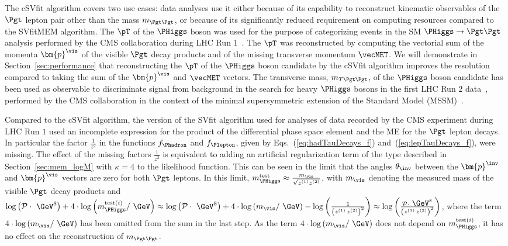 The cSVfit algorithm covers two use cases:
data analyses use it either because of its capability to reconstruct kinematic observables of the $\Pgt$ lepton pair other than the mass $m_{\Pgt\Pgt}$,
or because of its significantly reduced requirement on computing resources compared to the SVfitMEM algorithm.
The $\pT$ of the $\PHiggs$ boson was used for the purpose of categorizing events in the SM $\PHiggs \to \Pgt\Pgt$ analysis 
performed by the CMS collaboration during LHC Run $1$~\cite{HIG-13-004}.
The $\pT$ was reconstructed by computing the vectorial sum of the momenta $\bm{p}^{\vis}$ of the visible $\Pgt$ decay products and of the missing transverse momentum $\vecMET$.
We will demonstrate in Section~\ref{sec:performance} that reconstructing the $\pT$ of the $\PHiggs$ boson candidate by the cSVfit algorithm
improves the resolution compared to taking the sum of the $\bm{p}^{\vis}$ and $\vecMET$ vectors.
The transverse mass, $m_{T\Pgt\Pgt}$, of the $\PHiggs$ boson candidate has been used as observable to discriminate signal from background
in the search for heavy $\PHiggs$ bosons in the first LHC Run $2$ data~\cite{HIG-16-006}, 
performed by the CMS collaboration in the context of the minimal supersymmetric extension of the Standard Model (MSSM)~\cite{Fayet:1974pd,Fayet:1977yc}.

Compared to the cSVfit algorithm,
the version of the SVfit algorithm used for analyses of data recorded by the CMS experiment during LHC Run $1$
used an incomplete expression for the product of the differential phase space element and the ME for the $\Pgt$ lepton decays.
In particular the factor $\frac{1}{z^{2}}$ in the functions $f_{\Phadron}$ and $f_{\Plepton}$, 
given by Eqs.~(\ref{eq:hadTauDecays_f}) and~(\ref{eq:lepTauDecays_f}), were missing.
The effect of the missing factors $\frac{1}{z^{2}}$ 
is equivalent to adding an artificial regularization term of the type described in Section~\ref{sec:mem_logM} with $\kappa = 4$ to the likelihood function.
This can be seen in the limit that the angles $\theta_{\inv}$ between the $\bm{p}^{\inv}$ and $\bm{p}^{\vis}$ vectors are zero for both $\Pgt$ leptons.
In this limit, $m_{\PHiggs}^{\textrm{test}} \approx \frac{m_{\vis}}{\sqrt{z^{(1)}z^{(2)}}}$,
with $m_{\vis}$ denoting the measured mass of the visible $\Pgt$ decay products
and $\log \left( \mathcal{P} \cdot \mbox{~\GeV}^{8} \right) + 4 \cdot \log \left( m_{\PHiggs}^{\textrm{test}(i)} / \mbox{~\GeV} \right) \approx \log \left( \mathcal{P} \cdot \mbox{~\GeV}^{8} \right) + 4 \cdot \log \left( m_{\vis} / \mbox{~\GeV} \right) - \log \left( \frac{1}{\left( z^{(1)} \, z^{(2)} \right)^{2}} \right) \approx \log \left( \frac{\mathcal{P} \cdot \mbox{~\GeV}^{8}}{\left( z^{(1)} \, z^{(2)} \right)^{2}} \right)$,
where the term $4 \cdot \log \left( m_{\vis} / \mbox{~\GeV} \right)$ has been omitted from the sum in the last step.
As the term $4 \cdot \log \left( m_{\vis} / \mbox{~\GeV} \right)$ does not depend on $m_{\PHiggs}^{\textrm{test}(i)}$,
it has no effect on the reconstruction of $m_{\Pgt\Pgt}$.
